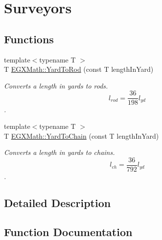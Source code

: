 \hypertarget{group___e_g_x_math-_conversions-_length_conversions-_imperial-_yard-_surveyors}{}\section{Surveyors}
\label{group___e_g_x_math-_conversions-_length_conversions-_imperial-_yard-_surveyors}
\subsection*{Functions}
\begin{DoxyCompactItemize}
\item 
{\footnotesize template$<$typename T $>$ }\\T \mbox{\hyperlink{group___e_g_x_math-_conversions-_length_conversions-_imperial-_yard-_surveyors_ga5c59ea68e354d48288451d711d68824f}{E\+G\+X\+Math\+::\+Yard\+To\+Rod}} (const T length\+In\+Yard)
\begin{DoxyCompactList}\small\item\em Converts a length in yards to rods. \[ l_{rod}= \frac{36}{198} l_{yd} \]. \end{DoxyCompactList}\item 
{\footnotesize template$<$typename T $>$ }\\T \mbox{\hyperlink{group___e_g_x_math-_conversions-_length_conversions-_imperial-_yard-_surveyors_ga057832281ac79e2226f88f90810047cf}{E\+G\+X\+Math\+::\+Yard\+To\+Chain}} (const T length\+In\+Yard)
\begin{DoxyCompactList}\small\item\em Converts a length in yards to chains. \[ l_{ch}= \frac{36}{792} l_{yd} \]. \end{DoxyCompactList}\end{DoxyCompactItemize}


\subsection{Detailed Description}


\subsection{Function Documentation}
\mbox{\label{group___e_g_x_math-_conversions-_length_conversions-_imperial-_yard-_surveyors_ga057832281ac79e2226f88f90810047cf}} 
